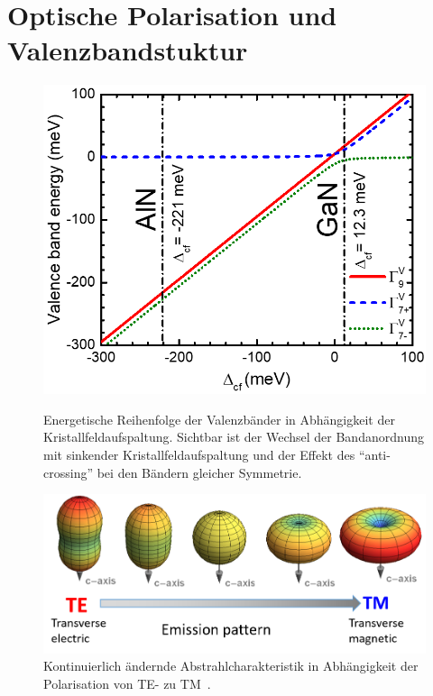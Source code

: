\thispagestyle{fancy}


\section{Optische Polarisation und Valenzbandstuktur}
\label{chap:polgrund}
%
\begin{figure}[H]
    \centering
    \begin{minipage}[t]{0.49\linewidth}
        \centering
        \includegraphics[width=\linewidth]{Bilder/vancebandPlot.png}
        \caption{Energetische Reihenfolge der Valenzbänder in Abhängigkeit der Kristallfeldaufspaltung. Sichtbar ist der Wechsel der Bandanordnung mit sinkender Kristallfeldaufspaltung und der Effekt des "`anti-crossing"' bei den Bändern gleicher Symmetrie. \cite{doi:10.1063/1.4932651}    }
        \label{fig:auger5k}
    \end{minipage}%
    \hfill
    \begin{minipage}[t]{0.49\linewidth}
        \centering
        \includegraphics[width=\linewidth]{Bilder/martinTETM.png}
        \caption{Kontinuierlich ändernde Abstrahlcharakteristik in Abhängigkeit der Polarisation von TE- zu TM~\cite{martingut}.  }
        \label{fig:martintetm}
    \end{minipage}
\end{figure}
